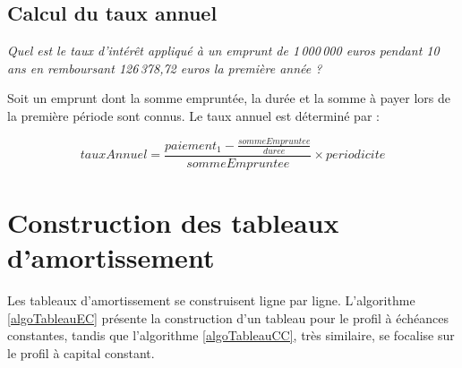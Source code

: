 \documentclass[11pt,a4paper]{scrartcl}
\begin{document}
\subsection{Calcul du taux annuel}
\emph{Quel est le taux d'intérêt appliqué à un emprunt de 1\,000\,000 euros pendant 10 ans en remboursant 126\,378,72 euros la première année ?}

Soit un emprunt dont la somme empruntée, la durée et la somme à payer lors de la première période sont connus. Le taux annuel est déterminé par :

\begin{equation}
	tauxAnnuel=\frac{paiement_1 - \frac{sommeEmpruntee}{duree}}{sommeEmpruntee}\times{periodicite}
\end{equation}



\section{Construction des tableaux d'amortissement}
Les tableaux d'amortissement se construisent ligne par ligne. L'algorithme \ref{algoTableauEC} présente la construction d'un tableau pour le profil à échéances constantes, tandis que l'algorithme \ref{algoTableauCC}, très similaire, se focalise sur le profil à capital constant.
\end{document}
